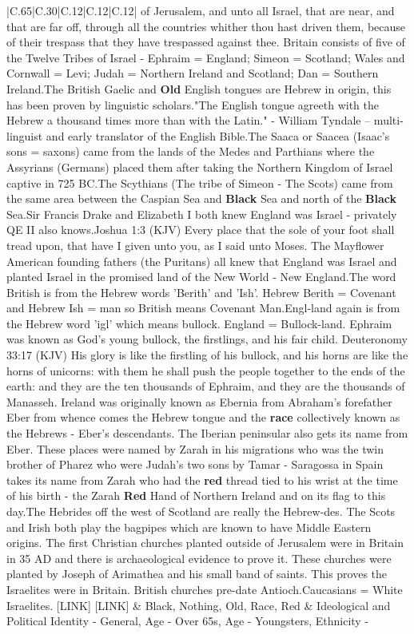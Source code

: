 \documentclass[11pt]{article}
\newlength\mylength
\begin{document}
\begin{center}
\begin{longtable}{|C{.65\mylength}|C{.30\mylength}|C{.12\mylength}|C{.12\mylength}|C{.12\mylength}|}
of Jerusalem, and unto all Israel, that are near, and that are far off, through all the countries whither thou hast driven them, because of their trespass that they have trespassed against thee. Britain consists of five of the Twelve Tribes of Israel - Ephraim = England; Simeon = Scotland; Wales and Cornwall = Levi; Judah = Northern Ireland and Scotland; Dan = Southern Ireland.The British Gaelic and \textbf{Old} English tongues are Hebrew in origin, this has been proven by linguistic scholars."The English tongue agreeth with the Hebrew a thousand times more than with the Latin."  - William Tyndale – multi-linguist and early translator of the English Bible.The Saaca or Saacea (Isaac's sons = saxons) came from the lands of the Medes and Parthians where the Assyrians (Germans) placed them after taking the Northern Kingdom of Israel captive in 725 BC.The Scythians (The tribe of Simeon - The Scots) came from the same area between the Caspian Sea and \textbf{Black} Sea and north of the \textbf{Black} Sea.Sir Francis Drake and Elizabeth I both knew England was Israel - privately QE II also knows.Joshua 1:3 (KJV) Every place that the sole of your foot shall tread upon, that have I given unto you, as I said unto Moses. The Mayflower American founding fathers (the Puritans) all knew that England was Israel and planted Israel in the promised land of the New World - New England.The word British is from the Hebrew words 'Berith' and 'Ish'. Hebrew Berith = Covenant and Hebrew Ish = man so British means Covenant Man.Engl-land again is from the Hebrew word 'igl' which means bullock. England = Bullock-land. Ephraim was known as God's young bullock, the firstlings, and his fair child. Deuteronomy 33:17 (KJV) His glory is like the firstling of his bullock, and his horns are like the horns of unicorns: with them he shall push the people together to the ends of the earth: and they are the ten thousands of Ephraim, and they are the thousands of Manasseh. Ireland was originally known as Ebernia from Abraham's forefather Eber from whence comes the Hebrew tongue and the \textbf{race} collectively known as the Hebrews - Eber's descendants. The Iberian peninsular also gets its name from Eber. These places were named by Zarah in his migrations who was the twin brother of Pharez who were Judah's two sons by Tamar - Saragossa in Spain takes its name from Zarah who had the \textbf{r\textbf{ed}} thread tied to his wrist at the time of his birth - the Zarah \textbf{R\textbf{ed}} Hand of Northern Ireland and on its flag to this day.The Hebrides off the west of Scotland are really the Hebrew-des. The Scots and Irish both play the bagpipes which are known to have Middle Eastern origins. The first Christian churches planted outside of Jerusalem were in Britain in 35 AD and there is archaeological evidence to prove it. These churches were planted by Joseph of Arimathea and his small band of saints. This proves the Israelites were in Britain. British churches pre-date Antioch.Caucasians = White Israelites. [LINK]  [LINK] \normalsize   & Black, Nothing, Old, Race, Red &  Ideological and Political Identity - General, Age - Over 65s, Age - Youngsters, Ethnicity - 
\end{longtable}
\end{center}
\end{document}
